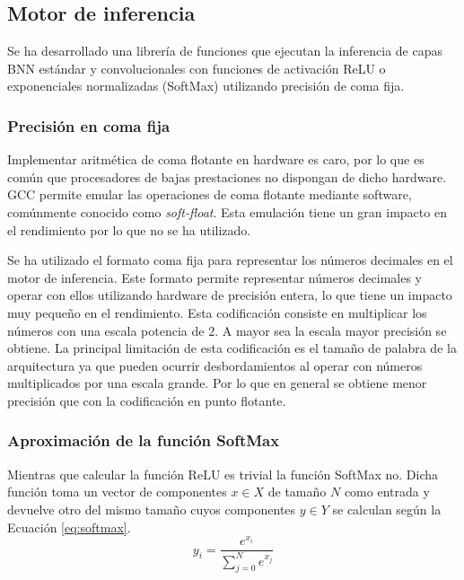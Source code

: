 \subsection{Motor de inferencia} \label{sec:motor_inferencia_c}

Se ha desarrollado una librería de funciones que ejecutan la inferencia de capas BNN estándar y convolucionales con funciones de activación ReLU o exponenciales normalizadas (SoftMax) utilizando precisión de coma fija. 

\subsubsection{Precisión en coma fija}

Implementar aritmética de coma flotante en hardware es caro, por lo que es común que procesadores de bajas prestaciones no dispongan de dicho hardware. GCC permite emular las operaciones de coma flotante mediante software, comúnmente conocido como \textit{soft-float}. Esta emulación tiene un gran impacto en el rendimiento por lo que no se ha utilizado.

Se ha utilizado el formato coma fija para representar los números decimales en el motor de inferencia. Este formato permite representar números decimales y operar con ellos utilizando hardware de precisión entera, lo que tiene un impacto muy pequeño en el rendimiento. Esta codificación consiste en multiplicar los números con una escala potencia de 2. A mayor sea la escala mayor precisión se obtiene. La principal limitación de esta codificación es el tamaño de palabra de la arquitectura ya que pueden ocurrir desbordamientos al operar con números multiplicados por una escala grande. Por lo que en general se obtiene menor precisión que con la codificación en punto flotante.

\subsubsection{Aproximación de la función SoftMax}

Mientras que calcular la función ReLU es trivial la función SoftMax no. Dicha función toma un vector de componentes $x \in X$ de tamaño $N$ como entrada y devuelve otro del mismo tamaño cuyos componentes $y\in Y$ se calculan según la Ecuación \ref{eq:softmax}.
\begin{equation} \label{eq:softmax}
y_i = \dfrac{e^{x_i}}{\sum_{j = 0}^N e^{x_j}}
\end{equation}

